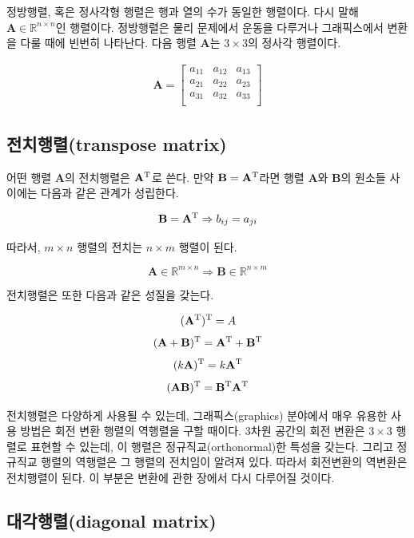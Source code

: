 정방행렬, 혹은 정사각형 행렬은 행과 열의 수가 동일한 행렬이다. 다시 말해 $\mathbf A \in \mathbb R^{n \times n}$인 행렬이다.
정방행렬은 물리 문제에서 운동을 다루거나 그래픽스에서 변환을 다룰 때에 빈번히 나타난다.
다음 행렬 $\mathbf A$는 $3\times 3$의 정사각 행렬이다.

\begin{eqnarray}
\mathbf A = \left [ 
\begin{array}{ccc}
a_{11} & a_{12} & a_{13} \\
a_{21} & a_{22} & a_{23} \\
a_{31} & a_{32} & a_{33} \\
\end{array}
\right ]
\label{eq:matrix33example}
\end{eqnarray}


\subsection{전치행렬(transpose matrix)}

어떤 행렬 $\mathbf A$의 전치행렬은 $\mathbf A^{\rm T}$로 쓴다.
만약 $\mathbf B = \mathbf A^{\rm T}$라면 행렬 $\mathbf A$와 $\mathbf B$의 원소들 사이에는 다음과 같은
관계가 성립한다.

$$
\mathbf B = \mathbf A^{\rm T} \Rightarrow b_{ij} = a_{ji}
$$

따라서, $m \times n$ 행렬의 전치는 $n \times m$ 행렬이 된다.

$$
\mathbf A \in \mathbb R^{m \times n} \Rightarrow \mathbf B \in \mathbb R^{n \times m}
$$

전치행렬은 또한 다음과 같은 성질을 갖는다.

$$
\mathbf (\mathbf A^{\rm T})^{\rm T} = A
$$
$$
(\mathbf A + \mathbf B)^{\rm T} = \mathbf A^{\rm T} + \mathbf B^{\rm T}
$$
$$
(k\mathbf A)^{\rm T} = k \mathbf A^{\rm T}
$$
$$
(\mathbf {AB})^{\rm T} = \mathbf B^{\rm T} \mathbf A^{\rm T}
$$

전치행렬은 다양하게 사용될 수 있는데, 그래픽스(graphics) 분야에서 매우 유용한 사용 방법은 회전 변환 행렬의 역행렬을 구할 때이다.
3차원 공간의 회전 변환은 $3 \times 3$ 행렬로 표현할 수 있는데, 이 행렬은 정규직교(orthonormal)한 특성을 갖는다.
그리고 정규직교 행렬의 역행렬은 그 행렬의 전치임이 알려져 있다. 따라서 회전변환의 역변환은 전치행렬이 된다.
이 부분은 변환에 관한 장에서 다시 다루어질 것이다.

\subsection{대각행렬(diagonal matrix)}

